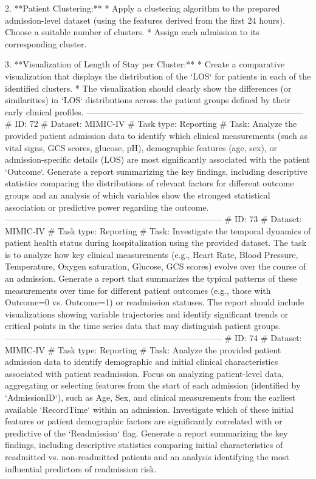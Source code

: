 \begin{tcolorbox}[colback=cadmiumgreen!5!white,colframe=forestgreen!75!white,breakable,title=\textit{Generated analytical tasks in task 4.}]
\begin{VerbatimWrap}
 2. **Patient Clustering:**
  * Apply a clustering algorithm to the prepared admission-level dataset (using the features derived from the first 24 hours). Choose a suitable number of clusters.
  * Assign each admission to its corresponding cluster.
 
 3. **Visualization of Length of Stay per Cluster:**
  * Create a comparative visualization that displays the distribution of the `LOS` for patients in each of the identified clusters. 
  * The visualization should clearly show the differences (or similarities) in `LOS` distributions across the patient groups defined by their early clinical profiles.
  -----------------------------------------------------------------------------
# ID: 72  
# Dataset: MIMIC-IV 
# Task type: Reporting
# Task: Analyze the provided patient admission data to identify which clinical measurements (such as vital signs, GCS scores, glucose, pH), demographic features (age, sex), or admission-specific details (LOS) are most significantly associated with the patient `Outcome`. Generate a report summarizing the key findings, including descriptive statistics comparing the distributions of relevant factors for different outcome groups and an analysis of which variables show the strongest statistical association or predictive power regarding the outcome.
-----------------------------------------------------------------------------
# ID: 73  
# Dataset: MIMIC-IV 
# Task type: Reporting
# Task: Investigate the temporal dynamics of patient health status during hospitalization using the provided dataset. The task is to analyze how key clinical measurements (e.g., Heart Rate, Blood Pressure, Temperature, Oxygen saturation, Glucose, GCS scores) evolve over the course of an admission. Generate a report that summarizes the typical patterns of these measurements over time for different patient outcomes (e.g., those with Outcome=0 vs. Outcome=1) or readmission statuses. The report should include visualizations showing variable trajectories and identify significant trends or critical points in the time series data that may distinguish patient groups.
-----------------------------------------------------------------------------
# ID: 74  
# Dataset: MIMIC-IV 
# Task type: Reporting
# Task: Analyze the provided patient admission data to identify demographic and initial clinical characteristics associated with patient readmission. Focus on analyzing patient-level data, aggregating or selecting features from the start of each admission (identified by `AdmissionID`), such as Age, Sex, and clinical measurements from the earliest available `RecordTime` within an admission. Investigate which of these initial features or patient demographic factors are significantly correlated with or predictive of the `Readmission` flag. Generate a report summarizing the key findings, including descriptive statistics comparing initial characteristics of readmitted vs. non-readmitted patients and an analysis identifying the most influential predictors of readmission risk.

\end{VerbatimWrap}
\end{tcolorbox}
